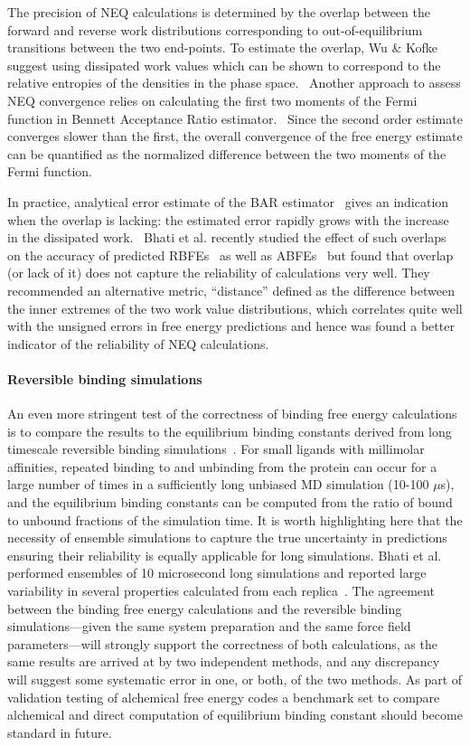 \documentclass[9pt,bestpractices]{livecoms}
\begin{document}
The precision of NEQ calculations is determined by the overlap between the forward and reverse work distributions corresponding to out-of-equilibrium transitions between the two end-points. To estimate the overlap, Wu \& Kofke suggest using dissipated work values which can be shown to correspond to the relative entropies of the densities in the phase space.~\cite{wu2005phase} Another approach to assess NEQ convergence relies on calculating the first two moments of the Fermi function in Bennett Acceptance Ratio estimator.~\cite{hahn2010measuring} Since the second order estimate converges slower than the first, the overall convergence of the free energy estimate can be quantified as the normalized difference between the two moments of the Fermi function. 

In practice, analytical error estimate of the BAR estimator~\cite{shirts2003equilibrium} gives an indication when the overlap is lacking: the estimated error rapidly grows with the increase in the dissipated work.~\cite{shirts2005comparison} Bhati et al. recently studied the effect of such overlaps on the accuracy of predicted RBFEs~\cite{wan2023eqvsneq} as well as ABFEs~\cite{bhati2025} but found that overlap (or lack of it) does not capture the reliability of calculations very well. They recommended an alternative metric, ``distance'' defined as the difference between the inner extremes of the two work value distributions, which correlates quite well with the unsigned errors in free energy predictions and hence was found a better indicator of the reliability of NEQ calculations. 

\paragraph{Reversible binding simulations}
An even more stringent test of the correctness of binding free energy calculations is to compare the results to the equilibrium binding constants derived from long timescale reversible binding simulations~\cite{pan2017quantitative}. For small ligands with millimolar affinities, repeated binding to and unbinding from the protein can occur for a large number of times in a sufficiently long unbiased MD simulation (10-100 $\mu$s), and the equilibrium binding constants can be computed from the ratio of bound to unbound fractions of the simulation time. 
It is worth highlighting here that the necessity of ensemble simulations to capture the true uncertainty in predictions ensuring their reliability is equally applicable for long simulations. Bhati et al. performed ensembles of 10 microsecond long simulations and reported large variability in several properties calculated from each replica~\cite{bhati2023}.
The agreement between the binding free energy calculations and the reversible binding simulations---given the same system preparation and the same force field parameters---will strongly support the correctness of both calculations, as the same results are arrived at by two independent methods, and any discrepancy will suggest some systematic error in one, or both, of the two methods. As part of validation testing of alchemical free energy codes a benchmark set to compare alchemical and direct computation of equilibrium binding constant should become standard in future.
\end{document}
